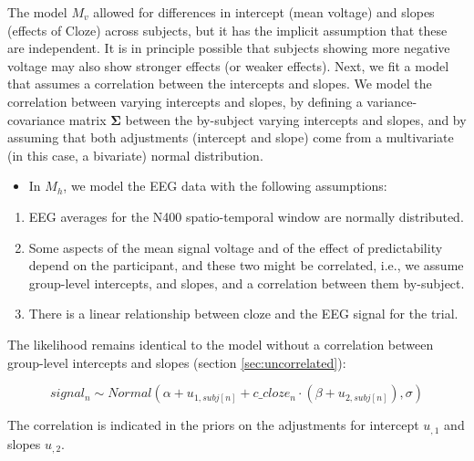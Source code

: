 \documentclass[12pt,]{krantz}
\providecommand{\tightlist}{%
  \setlength{\itemsep}{0pt}\setlength{\parskip}{0pt}}
\theoremstyle{definition}
\theoremstyle{definition}
\theoremstyle{definition}
\theoremstyle{remark}
\begin{document}
The model \(M_{v}\) allowed for differences in intercept (mean voltage)
and slopes (effects of Cloze) across subjects, but it has the implicit
assumption that these are independent. It is in principle possible that
subjects showing more negative voltage may also show stronger effects
(or weaker effects). Next, we fit a model that assumes a correlation
between the intercepts and slopes. We model the correlation between
varying intercepts and slopes, by defining a variance-covariance matrix
\(\boldsymbol{\Sigma}\) between the by-subject varying intercepts and
slopes, and by assuming that both adjustments (intercept and slope) come
from a multivariate (in this case, a bivariate) normal distribution.

\begin{itemize}
\tightlist
\item
  In \(M_h\), we model the EEG data with the following assumptions:
\end{itemize}

\begin{enumerate}
\def\labelenumi{\arabic{enumi}.}
\tightlist
\item
  EEG averages for the N400 spatio-temporal window are normally
  distributed.
\item
  Some aspects of the mean signal voltage and of the effect of
  predictability depend on the participant, and these two might be
  correlated, i.e., we assume group-level intercepts, and slopes, and a
  correlation between them by-subject. 
\item
  There is a linear relationship between cloze and the EEG signal for
  the trial.
\end{enumerate}

The likelihood remains identical to the model without a correlation
between group-level intercepts and slopes (section
\ref{sec:uncorrelated}):

\begin{equation}
  signal_n \sim Normal(\alpha + u_{1,subj[n]} + c\_cloze_n \cdot  (\beta + u_{2,subj[n]}),\sigma)
  \end{equation}

The correlation is indicated in the priors on the adjustments for
intercept \(u_{,1}\) and slopes \(u_{,2}\).
\end{document}
